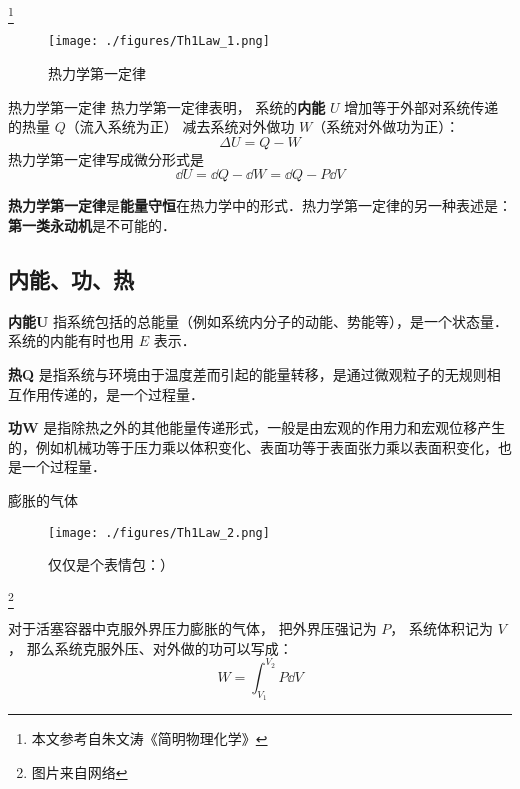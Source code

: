 
\begin{issues}
\issueDraft
\end{issues}

\footnote{本文参考自朱文涛《简明物理化学》}

\begin{figure}[ht]
\centering
\texttt{[image: ./figures/Th1Law\_1.png]}
\caption{热力学第一定律} \label{Th1Law_fig1}
\end{figure}

\begin{theorem}{热力学第一定律}
热力学第一定律表明， 系统的\textbf{内能} $U$ 增加等于外部对系统传递的热量 $Q$（流入系统为正） 减去系统对外做功 $W$（系统对外做功为正）：
\begin{equation}\label{Th1Law_eq1}
\Delta U = Q - W
\end{equation}
热力学第一定律写成微分形式是
\begin{equation} \label{Th1Law_eq2}
\dd U = \dd Q - \dd W =\dd Q - P \dd V
\end{equation}
\end{theorem}

\textbf{热力学第一定律}是\textbf{能量守恒}在热力学中的形式．热力学第一定律的另一种表述是：\textbf{第一类永动机}是不可能的．

\subsection{内能、功、热}
\textbf{内能U} 指系统包括的总能量（例如系统内分子的动能、势能等），是一个状态量．系统的内能有时也用 $E$ 表示． 

\textbf{热Q} 是指系统与环境由于温度差而引起的能量转移，是通过微观粒子的无规则相互作用传递的，是一个过程量．

\textbf{功W} 是指除热之外的其他能量传递形式，一般是由宏观的作用力和宏观位移产生的，例如机械功等于压力乘以体积变化、表面功等于表面张力乘以表面积变化，也是一个过程量．

\begin{example}{膨胀的气体}
\begin{figure}[ht]
\centering
\texttt{[image: ./figures/Th1Law\_2.png]}
\caption{仅仅是个表情包：）} \label{Th1Law_fig2}
\end{figure}
\footnote{图片来自网络}

对于活塞容器中克服外界压力膨胀的气体， 把外界压强记为 $P$， 系统体积记为 $V$， 那么系统克服外压、对外做的功可以写成：
\begin{equation}
W = \int_{V_1}^{V_2} P \dd{V}
\end{equation}
\end{example}

